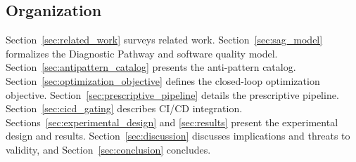 \subsection{Organization}
\label{sec:intro:org}

Section~\ref{sec:related_work} surveys related work. Section~\ref{sec:sag_model} formalizes the Diagnostic Pathway and software quality model. Section~\ref{sec:antipattern_catalog} presents the anti-pattern catalog. Section~\ref{sec:optimization_objective} defines the closed-loop optimization objective. Section~\ref{sec:prescriptive_pipeline} details the prescriptive pipeline. Section~\ref{sec:cicd_gating} describes CI/CD integration. Sections~\ref{sec:experimental_design} and \ref{sec:results} present the experimental design and results. Section~\ref{sec:discussion} discusses implications and threats to validity, and Section~\ref{sec:conclusion} concludes.
